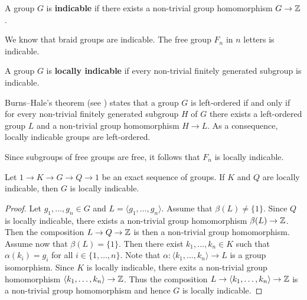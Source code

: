 
\begin{definition}
    A group $G$ is \textbf{indicable} if
    there exists a non-trivial group homomorphism $G\to\mathbb{Z}$.
\end{definition}

We know that braid groups are indicable.
The free group $F_n$ in $n$ letters is indicable. 

\begin{definition}
    A group $G$ is \textbf{locally indicable} if every 
    non-trivial finitely generated subgroup is indicable.
\end{definition}

Burns--Hale's theorem (see \cite[Theorem 1.50]{MR3560661}) states that a group $G$ is left-ordered if and only if
for every non-trivial finitely generated subgroup $H$ of $G$ there exists 
a left-ordered group $L$ and a non-trivial group homomorphism $H\to L$. As a consequence, 
locally indicable groups are left-ordered. 

\begin{example}
    Since subgroups of free groups are free, 
    it follows that $F_n$ is locally indicable. 
\end{example}

\begin{proposition}
\label{pro:LI_exact}
    Let $1\to K\to G\to Q\to 1$ be an exact sequence of groups. 
    If $K$ and $Q$ are
    locally indicable, then $G$ is locally indicable.
\end{proposition}

\begin{proof}
    Let $g_1,\dots,g_n\in G$ and $L=\langle g_1,\dots,g_n\rangle$. 
    Assume that $\beta(L)\ne\{1\}$. Since $Q$ is locally indicable, 
    there exists a non-trivial group homomorphism $\beta(L)\to\mathbb{Z}$. Then the 
    composition $L\to Q\to\mathbb{Z}$ is then a non-trivial group homomorphism. Assume now
    that $\beta(L)=\{1\}$. Then there exist $k_1,\dots,k_n\in K$ 
    such that $\alpha(k_i)=g_i$ for all $i\in\{1,\dots,n\}$. Note that
    $\alpha\colon \langle k_1,\dots,k_n\rangle\to L$ is a group isomorphism. Since
    $K$ is locally indicable, there exits a non-trivial group 
    homomorphism $\langle k_1,\dots,k_n\rangle\to\mathbb{Z}$. 
    Thus the composition $L\to\langle k_1,\dots,k_n\rangle\to\mathbb{Z}$ is a non-trivial
    group homomorphism 
    and hence $G$ is locally indicable. 
\end{proof}

